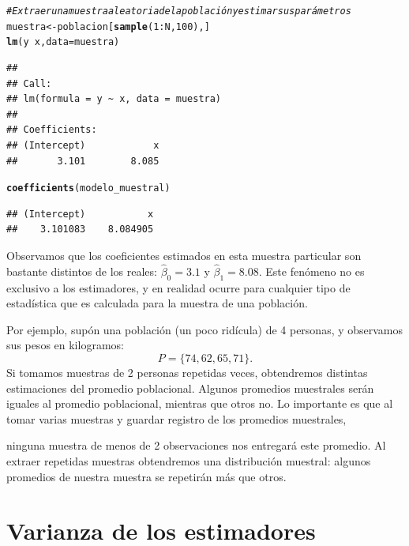 \documentclass{report}\usepackage[]{graphicx}\usepackage[]{color}
\makeatletter
\newcommand{\hlnum}[1]{\textcolor[rgb]{0.686,0.059,0.569}{#1}}%
\newcommand{\hlcom}[1]{\textcolor[rgb]{0.678,0.584,0.686}{\textit{#1}}}%
\newcommand{\hlopt}[1]{\textcolor[rgb]{0,0,0}{#1}}%
\newcommand{\hlstd}[1]{\textcolor[rgb]{0.345,0.345,0.345}{#1}}%
\newcommand{\hlkwb}[1]{\textcolor[rgb]{0.69,0.353,0.396}{#1}}%
\newcommand{\hlkwc}[1]{\textcolor[rgb]{0.333,0.667,0.333}{#1}}%
\newcommand{\hlkwd}[1]{\textcolor[rgb]{0.737,0.353,0.396}{\textbf{#1}}}%
\newenvironment{kframe}{%
 \def\at@end@of@kframe{}%
 \ifinner\ifhmode%
  \def\at@end@of@kframe{\end{minipage}}%
  \begin{minipage}{\columnwidth}%
 \fi\fi%
 \def\FrameCommand##1{\hskip\@totalleftmargin \hskip-\fboxsep
 \colorbox{shadecolor}{##1}\hskip-\fboxsep
     \hskip-\linewidth \hskip-\@totalleftmargin \hskip\columnwidth}%
 \MakeFramed {\advance\hsize-\width
   \@totalleftmargin\z@ \linewidth\hsize
   \@setminipage}}%
 {\par\unskip\endMakeFramed%
 \at@end@of@kframe}
\newenvironment{knitrout}{}{} %
\makeatother
\begin{document}
\begin{knitrout}
\color{fgcolor}\begin{kframe}
\begin{alltt}
\hlcom{# Extraer una muestra aleatoria de la población y estimar sus parámetros}
\hlstd{muestra} \hlkwb{<-} \hlstd{poblacion[}\hlkwd{sample}\hlstd{(}\hlnum{1}\hlopt{:}\hlstd{N,} \hlnum{100}\hlstd{),]}
\hlkwd{lm}\hlstd{(y}\hlopt{~}\hlstd{x,} \hlkwc{data} \hlstd{= muestra)}
\end{alltt}
\begin{verbatim}
## 
## Call:
## lm(formula = y ~ x, data = muestra)
## 
## Coefficients:
## (Intercept)            x  
##       3.101        8.085
\end{verbatim}
\begin{alltt}
\hlkwd{coefficients}\hlstd{(modelo_muestral)}
\end{alltt}
\begin{verbatim}
## (Intercept)           x 
##    3.101083    8.084905
\end{verbatim}
\end{kframe}
\end{knitrout}

Observamos que los coeficientes estimados en esta muestra particular son bastante distintos de los reales: $\hat\beta_0 = 3.1$ y $\hat\beta_1 = 8.08$.
Este fenómeno no es exclusivo a los estimadores, y en realidad ocurre para cualquier tipo de estadística que es calculada para la muestra de una población.

Por ejemplo, supón una población (un poco ridícula) de 4 personas, y observamos sus pesos en kilogramos:
\begin{equation*}
P = \{74, 62, 65, 71\}.
\end{equation*}
Si tomamos muestras de 2 personas repetidas veces, obtendremos distintas estimaciones del promedio poblacional. Algunos promedios muestrales serán iguales al promedio poblacional, mientras que otros no. Lo importante es que al tomar varias muestras y guardar registro de los promedios muestrales,

ninguna muestra de menos de 2 observaciones nos entregará este promedio. Al extraer repetidas muestras obtendremos una distribución muestral: algunos promedios de nuestra muestra se repetirán más que otros.

\hrulefill



\section{Varianza de los estimadores}
\end{document}
